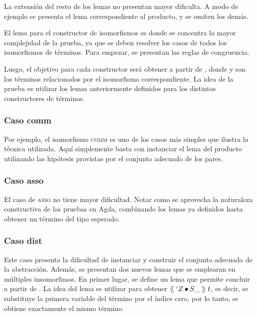 \documentclass[]{report}
\begin{document}
	
	La extensión del resto de los lemas no presentan mayor dificulta.
	A modo de ejemplo se presenta el lema correspondiente al producto, y se omiten los demás.
	
	
	El lema para el constructor de isomorfismos es donde se concentra la mayor complejidad de la prueba, ya que se deben resolver los casos de todos los isomorfismos de términos.
	Para empezar, se presentan las reglas de congruencia.
	
	
	Luego, el objetivo para cada constructor será obtener \snstar{} a partir de \snstar{}, donde  y  son los términos relacionados por el isomorfismo correspondiente.
	La idea de la prueba es utilizar los lemas anteriormente definidos para los distintos constructores de términos.
	
	\subsubsection{Caso comm}
	
	Por ejemplo, el isomorfismo \textsc{comm} es uno de los casos más simples que ilustra la técnica utilizada.
	Aquí simplemente basta con instanciar el lema del producto utilizando las hipótesis provistas por el conjunto adecuado de los pares.
	
	
	\subsubsection{Caso asso}
	
	El caso de \textsc{asso} no tiene mayor dificultad.
	Notar como se aprovecha la naturaleza constructiva de las pruebas en Agda, combinando los lemas ya definidos hasta obtener un término del tipo esperado.
	
	
	\subsubsection{Caso dist}
	
	Este caso presenta la dificultad de instanciar y construir el conjunto adecuado de la abstracción.
	Además, se presentan dos nuevos lemas que se emplearan en múltiples insomorfimos.
	En primer lugar, se define un lema que permite concluir \snstar{} a partir de \snstar {} .
	La idea del lema es utilizar  para obtener $\langle\!\langle\; `Z \bullet S\_ \;\rangle\!\rangle\;t$, es decir, se substituye la primera variable del término por el índice cero, por lo tanto, se obtiene exactamente el mismo término.
	
\end{document}
